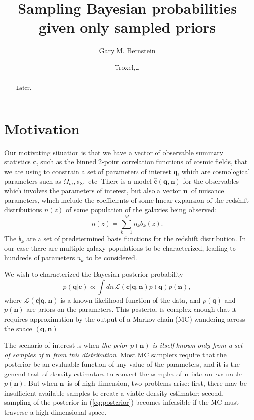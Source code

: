 \documentclass[linenumbers, onecolumn]{aastex63}
\newcommand{\vecc}{\ensuremath{\mathbf{c}}}
\newcommand{\vecq}{\ensuremath{\mathbf{q}}}
\newcommand{\vecn}{\ensuremath{\mathbf{n}}}
\newcommand{\hatc}{\ensuremath{\hat{\mathbf{c}}}}
\newcommand{\likeli}{\mathcal{L}}
\begin{document}
\title{Sampling Bayesian probabilities given only sampled priors}

\author[0000-0002-8613-8259]{Gary M. Bernstein}

\author{Troxel,\ldots}

\begin{abstract}
	\vspace{0.2in}
Later.
\end{abstract}
\reportnum{}

\section{Motivation} \label{sec:intro}

Our motivating situation is that we have a vector of observable summary statistics \vecc, such as the binned 2-point correlation functions of cosmic fields, that we are using to constrain a set of parameters of interest \vecq, which are cosmological parameters such as $\Omega_m, \sigma_8,$ etc.  There is a model $\hatc(\vecq,\vecn)$ for the observables which involves the parameters of interest, but also a vector \vecn\ of nuisance parameters, which include the coefficients of some linear expansion of the redshift distributions $n(z)$ of some population of the galaxies being observed:
\begin{equation}
  n(z) = \sum_{k=1}^{M} n_k b_k(z).
  \label{eq:nzbasis}
\end{equation}
The $b_k$ are a set of predetermined basis functions for the redshift distribution.  In our case there are multiple galaxy populations to be characterized, leading to hundreds of parameters $n_k$ to be considered.

We wish to characterized the Bayesian posterior probability
\begin{equation}
  p(\vecq | \vecc) \propto \int dn\, \likeli(\vecc | \vecq, \vecn) p(\vecq) p(\vecn),
\label{eq:posterior}
\end{equation}
where $\likeli(\vecc | \vecq, \vecn)$ is a known likelihood function
of the data, and $p(\vecq)$ and $p(\vecn)$ are priors on the
parameters.  This posterior is complex enough that it requires
approximation by the output of a Markov chain (MC) wandering across the space $(\vecq,\vecn).$

The scenario of interest is when \emph{the prior $p(\vecn)$ is itself known only from a set of samples of $\vecn$ from this distribution.} Most MC samplers require that the posterior be an evaluable function of any value of the parameters, and it is the general task of density estimators to convert the samples of $\vecn$ into an evaluable $p(\vecn).$  But when \vecn\ is of high dimension, two problems arise: first, there may be insufficient available samples to create a viable density estimator; second, sampling of the posterior in (\ref{eq:posterior}) becomes infeasible if the MC must traverse a high-dimensional space.
\end{document}
